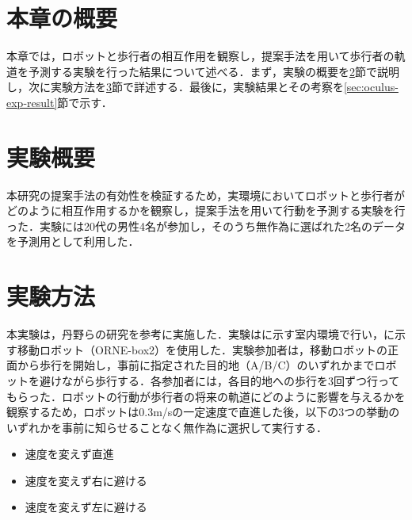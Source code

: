 

\section{本章の概要}

本章では，ロボットと歩行者の相互作用を観察し，提案手法を用いて歩行者の軌道を予測する実験を行った結果について述べる．まず，実験の概要を\ref{sec:oculus-exp-overview}節で説明し，次に実験方法を\ref{sec:oculus-exp-method}節で詳述する．最後に，実験結果とその考察を\ref{sec:oculus-exp-result}節で示す．

\section{実験概要}\label{sec:oculus-exp-overview}
本研究の提案手法の有効性を検証するため，実環境においてロボットと歩行者がどのように相互作用するかを観察し，提案手法を用いて行動を予測する実験を行った．実験には20代の男性4名が参加し，そのうち無作為に選ばれた2名のデータを予測用として利用した．

\section{実験方法}\label{sec:oculus-exp-method}
本実験は，丹野らの研究\cite{si2023-tanno}を参考に実施した．実験はに示す室内環境で行い，に示す移動ロボット（ORNE-box2\cite{井口颯人2023屋外自律移動ロボットプラットフォーム-orne}）を使用した．実験参加者は，移動ロボットの正面から歩行を開始し，事前に指定された目的地（A/B/C）のいずれかまでロボットを避けながら歩行する．各参加者には，各目的地への歩行を3回ずつ行ってもらった．ロボットの行動が歩行者の将来の軌道にどのように影響を与えるかを観察するため，ロボットは0.3m/sの一定速度で直進した後，以下の3つの挙動のいずれかを事前に知らせることなく無作為に選択して実行する．

\begin{itemize}
  \item 速度を変えず直進
  \item 速度を変えず右に避ける
  \item 速度を変えず左に避ける
\end{itemize}

